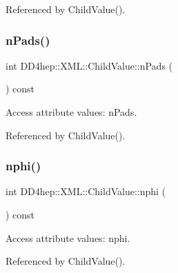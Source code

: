Referenced by Child\+Value().

\hypertarget{struct_d_d4hep_1_1_x_m_l_1_1_child_value_a50ff0a8b88c168c4c555da8cbe0bdca8}{}\label{struct_d_d4hep_1_1_x_m_l_1_1_child_value_a50ff0a8b88c168c4c555da8cbe0bdca8} 
\subsubsection{\texorpdfstring{n\+Pads()}{nPads()}}
{\footnotesize\ttfamily int D\+D4hep\+::\+X\+M\+L\+::\+Child\+Value\+::n\+Pads (\begin{DoxyParamCaption}{ }\end{DoxyParamCaption}) const}



Access attribute values\+: n\+Pads. 



Referenced by Child\+Value().

\hypertarget{struct_d_d4hep_1_1_x_m_l_1_1_child_value_a70ed8c988b37d11ca0dfc11c5a367577}{}\label{struct_d_d4hep_1_1_x_m_l_1_1_child_value_a70ed8c988b37d11ca0dfc11c5a367577} 
\subsubsection{\texorpdfstring{nphi()}{nphi()}}
{\footnotesize\ttfamily int D\+D4hep\+::\+X\+M\+L\+::\+Child\+Value\+::nphi (\begin{DoxyParamCaption}{ }\end{DoxyParamCaption}) const}



Access attribute values\+: nphi. 



Referenced by Child\+Value().

\hypertarget{struct_d_d4hep_1_1_x_m_l_1_1_child_value_afac8f929362411963a7d9e6dc1465c80}{}\label{struct_d_d4hep_1_1_x_m_l_1_1_child_value_afac8f929362411963a7d9e6dc1465c80} 
